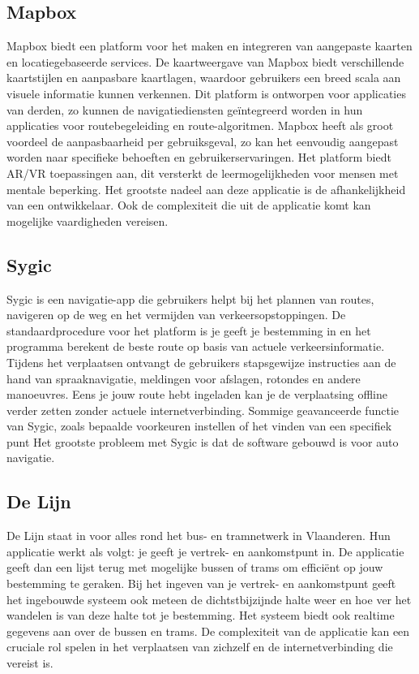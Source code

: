 \subsection{Mapbox}
\label{sec:mapbox}

Mapbox biedt een platform voor het maken en integreren van aangepaste kaarten en locatiegebaseerde services. De kaartweergave van Mapbox biedt verschillende kaartstijlen en aanpasbare kaartlagen, waardoor gebruikers een breed scala aan visuele informatie kunnen verkennen. Dit platform is ontworpen voor applicaties van derden, zo kunnen de navigatiediensten geïntegreerd worden in hun applicaties voor routebegeleiding en route-algoritmen. Mapbox heeft als groot voordeel de aanpasbaarheid per gebruiksgeval, zo kan het eenvoudig aangepast worden naar specifieke behoeften en gebruikerservaringen. Het platform biedt AR/VR toepassingen aan, dit versterkt de leermogelijkheden voor mensen met mentale beperking. Het grootste nadeel aan deze applicatie is de afhankelijkheid van een ontwikkelaar. Ook de complexiteit die uit de applicatie komt kan mogelijke vaardigheden vereisen.

\subsection{Sygic}
\label{sec:sygic}

Sygic is een navigatie-app die gebruikers helpt bij het plannen van routes, navigeren op de weg en het vermijden van verkeersopstoppingen. De standaardprocedure voor het platform is je geeft je bestemming in en het programma berekent de beste route op basis van actuele verkeersinformatie. Tijdens het verplaatsen ontvangt de gebruikers stapsgewijze instructies aan de hand van spraaknavigatie, meldingen voor afslagen, rotondes en andere manoeuvres. Eens je jouw route hebt ingeladen kan je de verplaatsing offline verder zetten zonder actuele internetverbinding. Sommige geavanceerde functie van Sygic, zoals bepaalde voorkeuren instellen of het vinden van een specifiek punt %
Het grootste probleem met Sygic is dat de software gebouwd is voor auto navigatie.


\subsection{De Lijn}
\label{sec:de-lijn}

De Lijn staat in voor alles rond het bus- en tramnetwerk in Vlaanderen. Hun applicatie werkt als volgt: je geeft je vertrek- en aankomstpunt in. De applicatie geeft dan een lijst terug met mogelijke bussen of trams om efficiënt op jouw bestemming te geraken. Bij het ingeven van je vertrek- en aankomstpunt geeft het ingebouwde systeem ook meteen de dichtstbijzijnde halte weer en hoe ver het wandelen is van deze halte tot je bestemming. Het systeem biedt ook realtime gegevens aan over de bussen en trams. De complexiteit van de applicatie kan een cruciale rol spelen in het verplaatsen van zichzelf en de internetverbinding die vereist is.

